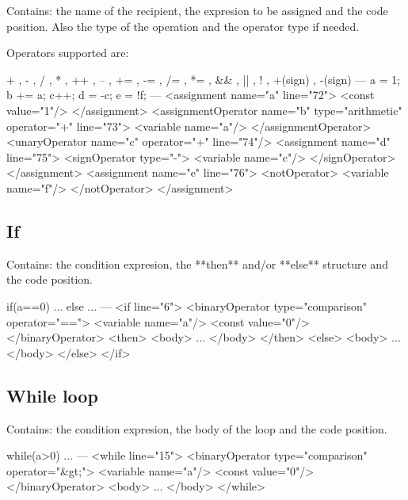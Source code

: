 Contains: the name of the recipient, the expresion to be assigned and the code position. Also the type of the operation and the operator type if needed.

Operators supported are:

        + , - , / , * , ++ , -- , += , -= , /= , *= , && , || , ! , +(sign) , -(sign)
---
        a = 1;
        b += a;
        c++;
        d = -c;
        e = !f;
---
        <assignment name="a" line="72">
            <const value="1"/>
        </assignment>
        <assignmentOperator name="b" type="arithmetic" operator="+" line="73">
            <variable name="a"/>
        </assignmentOperator>
        <unaryOperator name="c" operator="+" line="74"/>
        <assignment name="d" line="75">
            <signOperator type="-">
                <variable name="c"/>
            </signOperator>
        </assignment>
        <assignment name="e" line="76">
            <notOperator>
                <variable name="f"/>
            </notOperator>
        </assignment>


\subsection*{If}

Contains: the condition expresion, the **then** and/or **else** structure and the code position.

        if(a==0){
            ...
        }else{
            ...
        }
---
        <if line="6">
            <binaryOperator type="comparison" operator="==">
                <variable name="a"/>
                <const value="0"/>
            </binaryOperator>
            <then>
                <body>
                    ...
                </body>
            </then>
            <else>
                <body>
                    ...
                </body>
            </else>
        </if>

\subsection*{While loop}

Contains: the condition expresion, the body of the loop and the code position.

        while(a>0){
            ...
        }
---
        <while line="15">
            <binaryOperator type="comparison" operator="&gt;">
                <variable name="a"/>
                <const value="0"/>
            </binaryOperator>
            <body>
                ...
            </body>
        </while>

